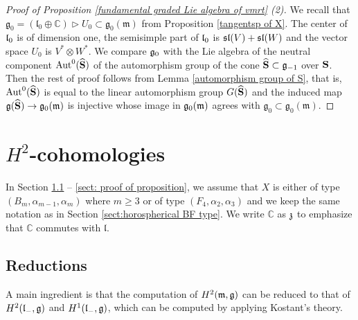 \documentclass[12pt]{amsart}
\theoremstyle{plain}
\theoremstyle{definition}
\def\Aut{\operatorname{Aut}}
\begin{document}
\begin{proof} [Proof of Proposition \ref{fundamental graded Lie algebra of vmrt} (2)]
 We recall that $\mathfrak g_0 =(\mathfrak l_0 \oplus \mathbb C   )\vartriangleright U_{0} \subset \mathfrak g_0(\mathfrak m)$ from Proposition \ref{tangentsp of X}. The center of $\frak l_0$ is of dimension one, the semisimple part of $\frak l_0$ is $\frak{sl}(V) + \frak {sl}(W)$ and the vector space $U_{0}$ is $V^* \otimes W^*$. We compare $\frak g_0$ with the Lie algebra of the neutral component $\Aut^0(\widehat{{\bf S}})$ of the automorphism group of the cone $\widehat{\bf S} \subset \frak g_{-1}$ over $\bf S$. %
 Then the rest of proof follows from Lemma \ref{automorphism group of S}, that is, $\Aut^0(\widehat{{\bf S}})$ is equal to the linear automorphism group $G(\widehat{\bf S})$    and the induced map $\frak g(\widehat{\bf S}) \rightarrow \frak g_0(\frak m)$ is injective whose image   in $\mathfrak g_0(\frak m)$ agrees with $\mathfrak g_0   \subset \mathfrak g_0(\mathfrak m)$.
%
\end{proof}

\section{$H^2$-cohomologies} \label{sect:H2 cohomology}


In Section \ref{sect:computation of H2 cohomology} -- \ref{sect: proof of proposition}, we assume that $X$ is either of type $(B_m, \alpha_{m-1}, \alpha_m)$ where $m \geq 3$ or of type $(F_4, \alpha_2, \alpha_3)$ and we keep the same notation as in Section \ref{sect:horospherical BF type}. We write $\mathbb C$ as $\frak z$ to emphasize that $\mathbb C$ commutes with $\mathfrak l$.

\subsection{Reductions}   \label{sect:computation of H2 cohomology}
%
A main ingredient is that the computation of $H^2(\frak m, \frak g)$ can be reduced to that of  $H^2(\frak l_-, \frak g)$ and $H^1(\frak l_-, \frak g)$, which can be computed  by applying Kostant's theory.
\end{document}
